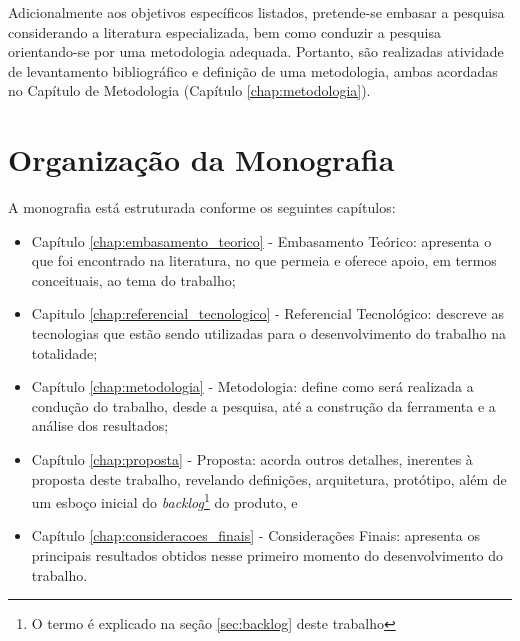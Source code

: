 Adicionalmente aos objetivos específicos listados, pretende-se embasar a pesquisa considerando a literatura especializada, bem como conduzir a pesquisa orientando-se por uma metodologia adequada. Portanto, são realizadas atividade de levantamento bibliográfico e definição de uma metodologia, ambas acordadas no Capítulo de Metodologia (Capítulo \ref{chap:metodologia}).


\section{Organização da Monografia}

\label{ref:organizacao}

A monografia está estruturada conforme os seguintes capítulos:

\begin{itemize}
    \item Capítulo \ref{chap:embasamento_teorico} - Embasamento Teórico: apresenta o que foi encontrado na literatura, no que permeia e oferece apoio, em termos conceituais, ao tema do trabalho;
    \item Capitulo \ref{chap:referencial_tecnologico} - Referencial Tecnológico: descreve as tecnologias que estão sendo utilizadas para o desenvolvimento do trabalho na totalidade;
    \item Capítulo \ref{chap:metodologia} - Metodologia: define como será realizada a condução do trabalho, desde a pesquisa, até a construção da ferramenta e a análise dos resultados;
    \item Capítulo \ref{chap:proposta} - Proposta: acorda outros detalhes, inerentes à proposta deste trabalho, revelando definições, arquitetura, protótipo, além de um esboço inicial do \textit{backlog}\footnote{O termo é explicado na seção \ref{sec:backlog} deste trabalho} do produto, e
    \item Capítulo \ref{chap:consideracoes_finais} - Considerações Finais: apresenta os principais resultados obtidos nesse primeiro momento do desenvolvimento do trabalho.
\end{itemize}